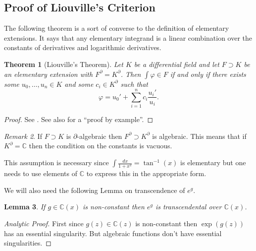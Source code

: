 \documentclass[12pt]{book}
\numberwithin{equation}{section}
\newtheorem{theorem}{Theorem}[subsection]
\newtheorem{lemma}[theorem]{Lemma}
\theoremstyle{definition}
\theoremstyle{remark}
\newtheorem{remark}[theorem]{Remark}
\newcommand{\CC}{\mathbb{C}}
\begin{document}
\subsection{Proof of Liouville's Criterion}

The following theorem is a sort of converse to the definition of elementary extensions. 
It says that any elementary integrand is a linear combination over the constants of derivatives and logarithmic derivatives. 
\begin{theorem}[Liouville's Theorem]
Let $K$ be a differential field and let $F \supset K$ be an elementary extension with $F^{\partial} = K^{\partial}$. 
Then $\int \varphi \in F$ if and only if there exists some $u_0,\ldots,u_n \in K$ and some $c_i \in K^{\partial}$ such that  
 $$ \varphi = u_0' + \sum_{i=1}^n c_i \dfrac{u_i'}{u_i}.$$ 
\end{theorem}
\begin{proof}
	See \cite[pg 169]{Risch1969}. 
	See also \cite[pg 59]{Hardy1971} for a ``proof by example''.
\end{proof}

\begin{remark}
If $F \supset K$ is $\partial$-algebraic then $F^{\partial}\supset K^{\partial}$ is algebraic. 
This means that if $K^{\partial}=\CC$ then the condition on the constants is vacuous.

This assumption is necessary since $\int \frac{dx}{1+x^2} = \tan^{-1}(x)$ is elementary but one needs to use elements of $\CC$ to express this in the appropriate form.
\end{remark} 

We will also need the following Lemma on transcendence of $e^g$.
\begin{lemma}
	If $g \in \CC(x)$ is non-constant then $e^g$ is transcendental over $\CC(x)$. 
\end{lemma}
\begin{proof}[Analytic Proof]
	First since $g(z) \in \CC(z)$ is non-constant then $\exp(g(z))$ has an essential singularity.
	But algebraic functions don't have essential singularities. 
\end{proof}
\end{document}
